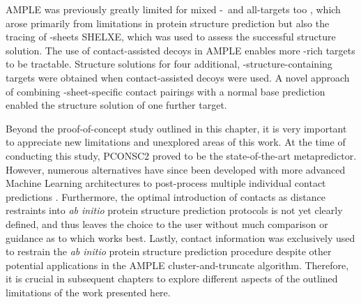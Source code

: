 AMPLE was previously greatly limited for mixed \textalpha-\textbeta\ and all-\textbeta targets too \cite{Bibby2012-lm}, which arose primarily from limitations in protein structure prediction but also the tracing of \textbeta-sheets SHELXE, which was used to assess the successful structure solution. The use of contact-assisted decoys in AMPLE enables more \textbeta-rich targets to be tractable. Structure solutions for four additional, \textbeta-structure-containing targets were obtained when contact-assisted decoys were used. A novel approach of combining \textbeta-sheet-specific contact pairings with a normal base prediction enabled the structure solution of one further target.

Beyond the proof-of-concept study outlined in this chapter, it is very important to appreciate new limitations and unexplored areas of this work. At the time of conducting this study, PCONSC2 proved to be the state-of-the-art metapredictor. However, numerous alternatives have since been developed with more advanced Machine Learning architectures to post-process multiple individual contact predictions \cite[e.g.,][]{Jones2015-vq,Ovchinnikov2015-tn}. Furthermore, the optimal introduction of contacts as distance restraints into \textit{ab initio} protein structure prediction protocols is not yet clearly defined, and thus leaves the choice to the user without much comparison or guidance as to which works best. Lastly, contact information was exclusively used to restrain the \textit{ab initio} protein structure prediction procedure despite other potential applications in the AMPLE cluster-and-truncate algorithm. Therefore, it is crucial in subsequent chapters to explore different aspects of the outlined limitations of the work presented here.
